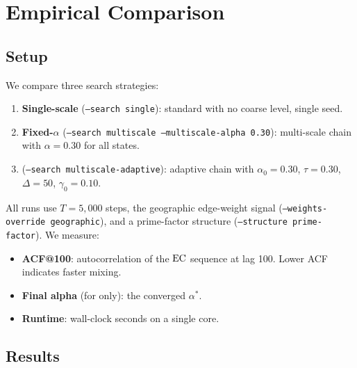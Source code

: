 \section{Empirical Comparison}
\label{sec:comparison}

\subsection{Setup}

We compare three search strategies:
\begin{enumerate}
  \item \textbf{Single-scale \recom{}} (\texttt{--search single}):
    standard \recom{} with no coarse level, single seed.
  \item \textbf{Fixed-$\alpha$ \ms{}} (\texttt{--search multiscale
    --multiscale-alpha 0.30}): multi-scale chain with $\alpha = 0.30$
    for all states.
  \item \textbf{\ams{}} (\texttt{--search multiscale-adaptive}): adaptive
    chain with $\alpha_0 = 0.30$, $\tau = 0.30$, $\Delta = 50$,
    $\gamma_0 = 0.10$.
\end{enumerate}

All runs use $T = 5{,}000$ steps, the geographic edge-weight signal
(\texttt{--weights-override geographic}), and a prime-factor structure
(\texttt{--structure prime-factor}).
We measure:
\begin{itemize}
  \item \textbf{ACF@100}: autocorrelation of the $\mathrm{EC}$ sequence at lag 100.
    Lower ACF indicates faster mixing.
  \item \textbf{Final alpha} (for \ams{} only): the converged $\alpha^*$.
  \item \textbf{Runtime}: wall-clock seconds on a single core.
\end{itemize}

\subsection{Results}

